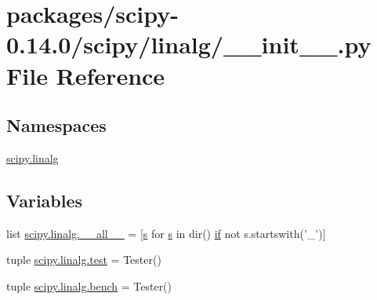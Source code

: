 \hypertarget{packages_2scipy-0_814_80_2scipy_2linalg_2____init_____8py}{}\section{packages/scipy-\/0.14.0/scipy/linalg/\+\_\+\+\_\+init\+\_\+\+\_\+.py File Reference}
\label{packages_2scipy-0_814_80_2scipy_2linalg_2____init_____8py}
\subsection*{Namespaces}
\begin{DoxyCompactItemize}
\item 
 \hyperlink{namespacescipy_1_1linalg}{scipy.\+linalg}
\end{DoxyCompactItemize}
\subsection*{Variables}
\begin{DoxyCompactItemize}
\item 
list \hyperlink{namespacescipy_1_1linalg_a63158add5d39fe2377cbc06247a194b7}{scipy.\+linalg.\+\_\+\+\_\+all\+\_\+\+\_\+} = \mbox{[}\hyperlink{indexexpr_8h_ae024b0db549122b44c349ae28ec990dc}{s} for \hyperlink{indexexpr_8h_ae024b0db549122b44c349ae28ec990dc}{s} in dir() \hyperlink{minmax_8h_a30a0ee9fee303f01d9c5e6f669e0dfe9}{if} not s.\+startswith('\+\_\+')\mbox{]}
\item 
tuple \hyperlink{namespacescipy_1_1linalg_a2ae3d22ab02369253ff16df0bf6d00e2}{scipy.\+linalg.\+test} = Tester()
\item 
tuple \hyperlink{namespacescipy_1_1linalg_a092ee30669cf7e85b1818062aac0a437}{scipy.\+linalg.\+bench} = Tester()
\end{DoxyCompactItemize}
